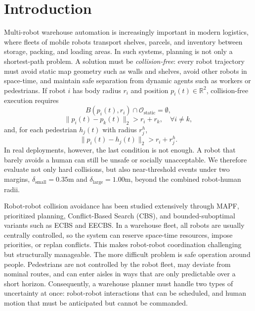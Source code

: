 \documentclass[10pt,twocolumn,letterpaper]{article}
\begin{document}
\section{Introduction}
Multi-robot warehouse automation is increasingly important in modern logistics, where fleets of mobile robots transport shelves, parcels, and inventory between storage, packing, and loading areas. In such systems, planning is not only a shortest-path problem. A solution must be \emph{collision-free}: every robot trajectory must avoid static map geometry such as walls and shelves, avoid other robots in space-time, and maintain safe separation from dynamic agents such as workers or pedestrians. If robot $i$ has body radius $r_i$ and position $p_i(t) \in \mathbb{R}^2$, collision-free execution requires
\begin{equation}
    B(p_i(t), r_i) \cap \mathcal{O}_{\mathrm{static}} = \emptyset,
\end{equation}
\begin{equation}
    \|p_i(t) - p_k(t)\|_2 > r_i + r_k, \quad \forall i \neq k,
\end{equation}
and, for each pedestrian $h_j(t)$ with radius $r^h_j$,
\begin{equation}
    \|p_i(t) - h_j(t)\|_2 > r_i + r^h_j.
\end{equation}
In real deployments, however, the last condition is not enough. A robot that barely avoids a human can still be unsafe or socially unacceptable. We therefore evaluate not only hard collisions, but also near-threshold events under two margins, $\delta_{\mathrm{small}}=0.35$m and $\delta_{\mathrm{large}}=1.00$m, beyond the combined robot-human radii.

Robot-robot collision avoidance has been studied extensively through MAPF, prioritized planning, Conflict-Based Search (CBS), and bounded-suboptimal variants such as ECBS and EECBS. In a warehouse fleet, all robots are usually centrally controlled, so the system can reserve space-time resources, impose priorities, or replan conflicts. This makes robot-robot coordination challenging but structurally manageable. The more difficult problem is safe operation around people. Pedestrians are not controlled by the robot fleet, may deviate from nominal routes, and can enter aisles in ways that are only predictable over a short horizon. Consequently, a warehouse planner must handle two types of uncertainty at once: robot-robot interactions that can be scheduled, and human motion that must be anticipated but cannot be commanded.
\end{document}

